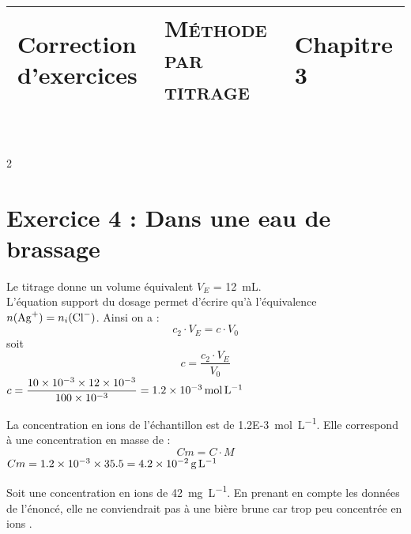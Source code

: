 \documentclass[a4paper,11pt,fleqn]{article}%
\title{\vspace{-1cm}\large 
	\begin{tabular}{|>{\centering}m{5cm}|>{\centering}m{8cm}|>{\centering\arraybackslash}m{4cm}|}
		\hline
		Correction d'exercices & \textbf{\textsc{Méthode par titrage}} &  Chapitre 3 \\
		\hline
\end{tabular}}
\date{}
\begin{document}
\maketitle
\vspace{-2.5cm}
\begin{multicols}{2}

\section*{Exercice 4 : Dans une eau de brassage}
Le titrage donne un volume équivalent $V_E$ = \SI{12}{mL}.\\
L'équation support du dosage permet d'écrire qu'à l'équivalence $n(\ce{Ag+}) = n_i(\ce{Cl-}) $. Ainsi on a : $$c_2 \cdot V_E = c \cdot V_0$$
soit  $$c = \dfrac{c_2 \cdot V_E}{ V_0}$$
 $c= \dfrac{ \num{10E-3} \times \num{12E-3}}{ \num{100E-3}} = \SI{1.2E-3}{\mole\per\liter}$

La concentration en ions  de l'échantillon est de \SI{1.2E-3}{\mole\per\liter}. Elle correspond à une concentration en masse de : $$Cm = C \cdot M$$
 $Cm=\num{1.2E-3} \times \num{35.5} = \SI{4.2E-2}{\gram\per\liter}$

Soit une concentration en ions  de \SI{42}{\milli\gram\per\liter}. En prenant en compte les données de l'énoncé, elle ne conviendrait pas à une bière brune car trop peu concentrée en ions .\\


\end{multicols}
\end{document}
